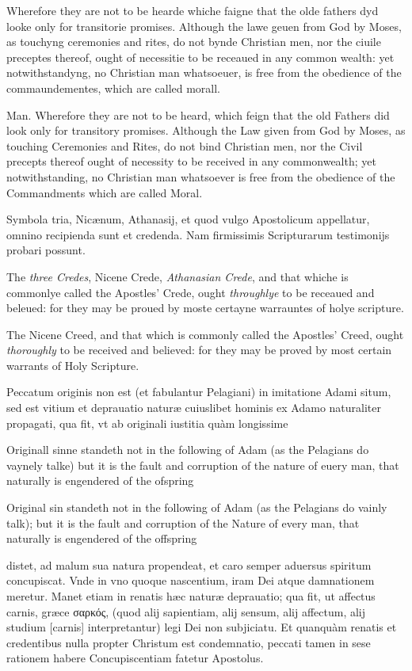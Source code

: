Wherefore they are not to be hearde whiche faigne that the olde fathers dyd looke only for transitorie promises. Although the lawe geuen from God by Moses, as touchyng ceremonies and rites, do not bynde Christian men, nor the ciuile preceptes thereof, ought of necessitie to be receaued in any common wealth: yet notwithstandyng, no Christian man whatsoeuer, is free from the obedience of the commaundementes, which are called morall.

Man. Wherefore they are not to be heard, which feign that the old Fathers did look only for transitory promises. Although the Law given from God by Moses, as touching Ceremonies and Rites, do not bind Christian men, nor the Civil precepts thereof ought of necessity to be received in any commonwealth; yet notwithstanding, no Christian man whatsoever is free from the obedience of the Commandments which are called Moral.


Symbola tria, Nicænum, Athanasij, et quod vulgo Apostolicum appellatur, omnino recipienda sunt et credenda. Nam firmissimis Scripturarum testimonijs probari possunt.

The \emph{three Credes}, Nicene Crede, \emph{Athanasian Crede}, and that whiche is commonlye called the Apostles' Crede, ought \emph{throughlye} to be receaued and beleued: for they may be proued by moste certayne warrauntes of holye scripture.

The Nicene Creed, and that which is commonly called the Apostles' Creed, ought \emph{thoroughly} to be received and believed: for they may be proved by most certain warrants of Holy Scripture.


Peccatum originis non est (et fabulantur Pelagiani) in imitatione Adami situm, sed est vitium et deprauatio naturæ cuiuslibet hominis ex Adamo naturaliter propagati, qua fit, vt ab originali iustitia quàm longissime

Originall sinne standeth not in the following of Adam (as the Pelagians do vaynely talke) but it is the fault and corruption of the nature of euery man, that naturally is engendered of the ofspring

Original sin standeth not in the following of Adam (as the Pelagians do vainly talk); but it is the fault and corruption of the Nature of every man, that naturally is engendered of the offspring

distet, ad malum sua natura propendeat, et caro semper aduersus spiritum concupiscat. Vnde in vno quoque nascentium, iram Dei atque damnationem meretur. Manet etiam in renatis hæc naturæ deprauatio; qua fit, ut affectus carnis, græce \textgreek{σαρκός}, (quod alij sapientiam, alij sensum, alij affectum, alij studium  [carnis] interpretantur) legi Dei non subjiciatu. Et quanquàm renatis et credentibus nulla propter Christum est condemnatio, peccati tamen in sese rationem habere Concupiscentiam fatetur Apostolus.

